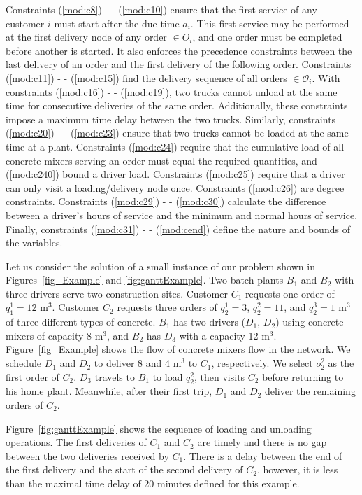 \documentclass{article}
\begin{document}
Constraints (\ref{mod:c8}) - - (\ref{mod:c10}) ensure that the first service of any customer $i$ must start after the due time $a_i$. This first service may be performed at the first delivery node of any order $\in O_i$, and one order must be completed before another is started. It also enforces the precedence constraints between the last delivery of an order and the first delivery of the following order.
Constraints (\ref{mod:c11}) - - (\ref{mod:c15}) find the delivery sequence of all orders $\in \mathcal{O}_i$. With constraints (\ref{mod:c16}) - - (\ref{mod:c19}), two trucks cannot unload at the same time for consecutive deliveries of the same order. Additionally, these constraints impose a maximum time delay between the two trucks. Similarly, constraints (\ref{mod:c20}) - - (\ref{mod:c23}) ensure that two trucks cannot be loaded at the same time at a plant. Constraints (\ref{mod:c24}) require that the cumulative load of all concrete mixers serving an order must equal the required quantities, and (\ref{mod:c240}) bound a driver load.  Constraints (\ref{mod:c25}) require that a driver can only visit a loading/delivery node once. Constraints (\ref{mod:c26}) are degree constraints. Constraints (\ref{mod:c29}) - - (\ref{mod:c30}) calculate the difference between a driver's hours of service and the minimum and normal hours of service. Finally, constraints (\ref{mod:c31}) - - (\ref{mod:cend}) define the nature and bounds of the variables.

Let us consider the solution of a small instance of our problem shown in Figures~\ref{fig_Example} and \ref{fig:ganttExample}. Two batch plants $B_1$ and $B_2$ with three drivers serve two construction sites. Customer $C_1$ requests one order of $q^1_1=12$ m$^3$. Customer $C_2$ requests three orders of $q^1_2=3$, $q^2_2=11$, and $q^3_2=1$ m$^3$ of three different types of concrete. $B_1$ has two drivers ($D_1$, $D_2$) using concrete mixers of capacity 8 m$^3$, and $B_2$ has $D_3$ with a capacity 12 m$^3$. Figure~\ref{fig_Example} shows the flow of concrete mixers flow in the network. We schedule $D_1$ and $D_2$ to deliver 8 and 4 m$^3$ to $C_1$, respectively. We select $o^2_2$ as the first order of $C_2$. $D_3$ travels to $B_1$ to load $q^2_2$, then visits $C_2$ before returning to his home plant. Meanwhile, after their first trip,  $D_1$ and $D_2$ deliver the remaining orders of $C_2$.

Figure~\ref{fig:ganttExample} shows the sequence of loading and unloading operations. The first deliveries of $C_1$ and $C_2$ are timely and there is no gap between the two deliveries received by $C_1$. There is a delay between the end of the first delivery and the start of the second delivery of $C_2$, however, it is less than the maximal time delay of 20 minutes defined for this example.
\end{document}

